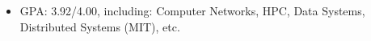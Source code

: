 
\begin{itemize}[nosep]
  \item GPA: 3.92/4.00, including: Computer Networks, HPC, Data Systems, Distributed Systems (MIT), etc.
\end{itemize}
